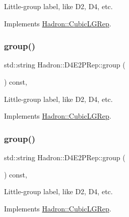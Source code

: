 Little-\/group label, like D2, D4, etc. 

Implements \mbox{\hyperlink{structHadron_1_1CubicLGRep_a9bdb14b519a611d21379ed96a3a9eb41}{Hadron\+::\+Cubic\+L\+G\+Rep}}.

\mbox{\label{structHadron_1_1D4E2PRep_aed8be064eb6b01ca2b29d54130ac7023}} 
\subsubsection{\texorpdfstring{group()}{group()}\hspace{0.1cm}{\footnotesize\ttfamily [2/3]}}
{\footnotesize\ttfamily std\+::string Hadron\+::\+D4\+E2\+P\+Rep\+::group (\begin{DoxyParamCaption}{ }\end{DoxyParamCaption}) const\hspace{0.3cm}{\ttfamily [inline]}, {\ttfamily [virtual]}}

Little-\/group label, like D2, D4, etc. 

Implements \mbox{\hyperlink{structHadron_1_1CubicLGRep_a9bdb14b519a611d21379ed96a3a9eb41}{Hadron\+::\+Cubic\+L\+G\+Rep}}.

\mbox{\label{structHadron_1_1D4E2PRep_aed8be064eb6b01ca2b29d54130ac7023}} 
\subsubsection{\texorpdfstring{group()}{group()}\hspace{0.1cm}{\footnotesize\ttfamily [3/3]}}
{\footnotesize\ttfamily std\+::string Hadron\+::\+D4\+E2\+P\+Rep\+::group (\begin{DoxyParamCaption}{ }\end{DoxyParamCaption}) const\hspace{0.3cm}{\ttfamily [inline]}, {\ttfamily [virtual]}}

Little-\/group label, like D2, D4, etc. 

Implements \mbox{\hyperlink{structHadron_1_1CubicLGRep_a9bdb14b519a611d21379ed96a3a9eb41}{Hadron\+::\+Cubic\+L\+G\+Rep}}.

\mbox{\label{structHadron_1_1D4E2PRep_a9cabd3c1f3fd0325a694d960a363e8b2}} 
